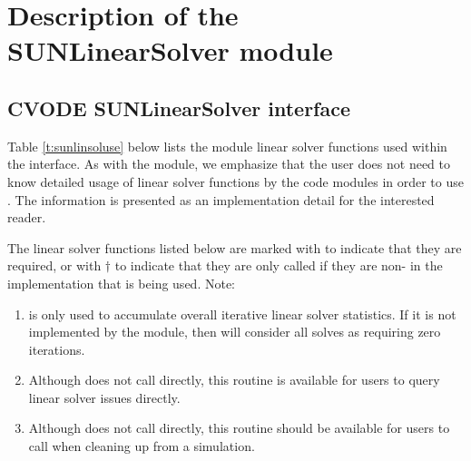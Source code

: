 \chapter{Description of the SUNLinearSolver module}\label{s:sunlinsol}



\section{CVODE SUNLinearSolver interface}
\label{s:sunlinsol_interface}

Table \ref{t:sunlinsoluse} below lists the {\sunlinsol} module linear solver
functions used within the {\cvls} interface. As with the {\sunmatrix} module, we
emphasize that the {\cvode} user does not need to know detailed usage of linear
solver functions by the {\cvode} code modules in order to use {\cvode}. The
information is presented as an implementation detail for the interested reader.

The linear solver functions listed below are marked with \cm to
indicate that they are required, or with $\dagger$ to indicate that
they are only called if they are non- in the {\sunlinsol}
implementation that is being used. Note:
\begin{enumerate}
\item {} is only used to accumulate overall
  iterative linear solver statistics.  If it is not implemented by
  the {\sunlinsol} module, then {\cvls} will consider all solves as
  requiring zero iterations.
\item Although {\cvls} does not call 
  directly, this routine is available for users to query linear solver
  issues directly.
\item Although {\cvls} does not call 
  directly, this routine should be available for users to call when
  cleaning up from a simulation.
\end{enumerate}

